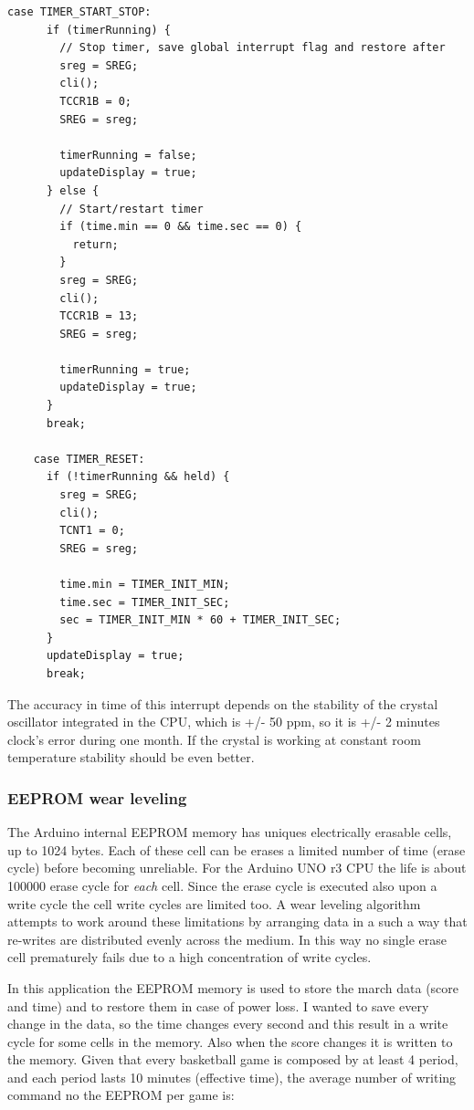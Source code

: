 \documentclass[11pt,english]{article}
\begin{document}
%
\begin{lstlisting}[label=lis:timer-use,caption=Use of the timer]
case TIMER_START_STOP:
      if (timerRunning) {
        // Stop timer, save global interrupt flag and restore after
        sreg = SREG;
        cli();
        TCCR1B = 0;
        SREG = sreg;

        timerRunning = false;
        updateDisplay = true;
      } else {
        // Start/restart timer
        if (time.min == 0 && time.sec == 0) {
          return;
        }
        sreg = SREG;
        cli();
        TCCR1B = 13;
        SREG = sreg;

        timerRunning = true;
        updateDisplay = true;
      }
      break;

    case TIMER_RESET:
      if (!timerRunning && held) {
        sreg = SREG;
        cli();
        TCNT1 = 0;
        SREG = sreg;

        time.min = TIMER_INIT_MIN;
        time.sec = TIMER_INIT_SEC;
        sec = TIMER_INIT_MIN * 60 + TIMER_INIT_SEC;
      }
      updateDisplay = true;
      break;
\end{lstlisting}


The accuracy in time of this interrupt depends on the stability of the crystal oscillator integrated in the CPU, 
which is +/- 50 ppm, so it is +/- 2 minutes clock's error during one month. If the crystal is working at constant 
room temperature stability should be even better.  



\subsubsection{EEPROM wear leveling} \label{subsubsec:wear-level}

The Arduino internal EEPROM memory has uniques electrically erasable cells, up to 1024 bytes. Each of these 
cell can be erases a limited number of time (erase cycle) before becoming unreliable. For the Arduino UNO r3
CPU the life is about 100000 erase cycle for \emph{each} cell. Since the erase cycle is executed 
also upon a write cycle the cell write cycles are limited too. A wear leveling algorithm attempts to work around 
these limitations by arranging data in a such a way that re-writes are distributed evenly across the medium. 
In this way no single erase cell prematurely fails due to a high concentration of write cycles. 

In this application the EEPROM memory is used to store the march data (score and time) and to restore them in 
case of power loss. I wanted to save every change in the data, so the time changes every second and this result 
in a write cycle for some cells in the memory. Also when the score changes it is written to the memory. 
Given that every basketball game is composed by at least 4 period, and each period lasts 10 minutes (effective 
time), the average number of writing command no the EEPROM per game is:
\end{document}

